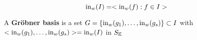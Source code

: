 

\begin{equation}
    \initw{I} = <\initw{f}:f\in I>
\end{equation}

A \textbf{Gröbner basis} is a set $G=\{\initw{g_1},\dots,\initw{g_s}\}\subset I$ with $<\initw{g_1},\dots,\initw{g_s}> = \initw{I}$ in $S_\K$